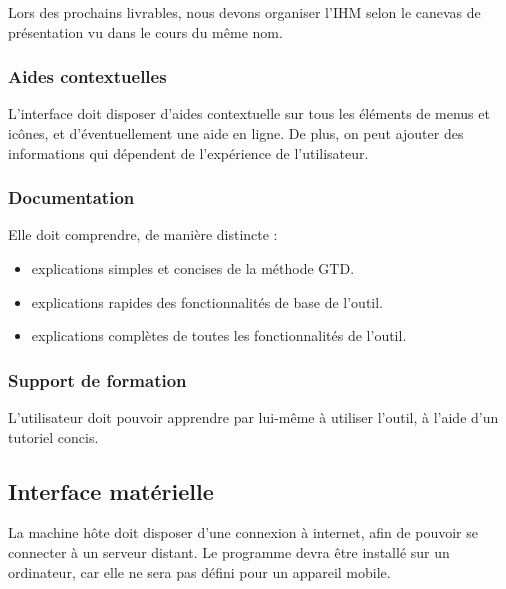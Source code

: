 Lors des prochains livrables, nous devons organiser l'IHM selon le canevas de présentation vu dans le cours du même nom.

\subsubsection{Aides contextuelles}
L'interface doit disposer d'aides contextuelle sur tous les éléments de menus et icônes, et d'éventuellement une aide en ligne.
De plus, on peut ajouter des informations qui dépendent de l'expérience de l'utilisateur.

\subsubsection{Documentation}
Elle doit comprendre, de manière distincte :
\begin{itemize}
 \item explications simples et concises de la méthode GTD.
 \item explications rapides des fonctionnalités de base de l'outil.
 \item explications complètes de toutes les fonctionnalités de l'outil.
\end{itemize}

\subsubsection{Support de formation}
L'utilisateur doit pouvoir apprendre par lui-même à utiliser l'outil, à l'aide d'un tutoriel concis.

	\subsection{Interface matérielle}

La machine hôte doit disposer d'une connexion à internet, afin de pouvoir se connecter à un serveur distant.
Le programme devra être installé sur un ordinateur, car elle ne sera pas défini pour un appareil mobile.

